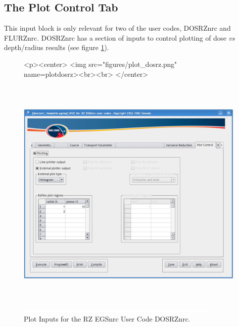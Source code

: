 \documentclass[12pt,twoside]{article}   %
\begin{document}
\newpage
\subsection{The Plot Control Tab}

This input block is only relevant for two of the user codes, DOSRZnrc and FLURZnrc. 
DOSRZnrc has a section of inputs to control plotting of dose {\em vs} depth/radius results
(see figure \ref{plotdosrz}). 
\begin{figure}[htb]
\begin{htmlonly}
\begin{rawhtml}
<p><center>
<img src="figures/plot_dosrz.png" name=plotdosrz><br><br>
</center>
\end{rawhtml}
\end{htmlonly}
\begin{latexonly}
\begin{center}
\includegraphics[height=11.56cm]{figures/plot_dosrz}
\end{center}
\end{latexonly}
\begin{center}
\includegraphics[height=1mm]{figures/fake2}
\end{center}
\caption{Plot Inputs for the RZ EGSnrc User Code DOSRZnrc.}
\label{plotdosrz}
\end{figure}
\end{document}
